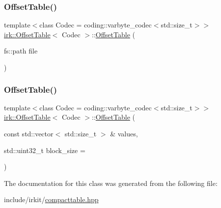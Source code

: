 \subsubsection{\texorpdfstring{Offset\+Table()}{OffsetTable()}\hspace{0.1cm}{\footnotesize\ttfamily [1/2]}}
{\footnotesize\ttfamily template$<$class Codec  = coding\+::varbyte\+\_\+codec$<$std\+::size\+\_\+t$>$$>$ \\
\mbox{\hyperlink{classirk_1_1OffsetTable}{irk\+::\+Offset\+Table}}$<$ Codec $>$\+::\mbox{\hyperlink{classirk_1_1OffsetTable}{Offset\+Table}} (\begin{DoxyParamCaption}\item[{fs\+::path}]{file }\end{DoxyParamCaption})\hspace{0.3cm}{\ttfamily [inline]}}

\mbox{\label{classirk_1_1OffsetTable_a5d874761d8bc70f468fe9df4f3d50cad}} 
\subsubsection{\texorpdfstring{Offset\+Table()}{OffsetTable()}\hspace{0.1cm}{\footnotesize\ttfamily [2/2]}}
{\footnotesize\ttfamily template$<$class Codec  = coding\+::varbyte\+\_\+codec$<$std\+::size\+\_\+t$>$$>$ \\
\mbox{\hyperlink{classirk_1_1OffsetTable}{irk\+::\+Offset\+Table}}$<$ Codec $>$\+::\mbox{\hyperlink{classirk_1_1OffsetTable}{Offset\+Table}} (\begin{DoxyParamCaption}\item[{const std\+::vector$<$ std\+::size\+\_\+t $>$ \&}]{values,  }\item[{std\+::uint32\+\_\+t}]{block\+\_\+size = {} }\end{DoxyParamCaption})\hspace{0.3cm}{\ttfamily [inline]}}



The documentation for this class was generated from the following file\+:\begin{DoxyCompactItemize}
\item 
include/irkit/\mbox{\hyperlink{compacttable_8hpp}{compacttable.\+hpp}}\end{DoxyCompactItemize}
